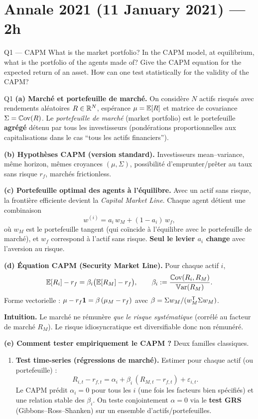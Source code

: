 \section{Annale 2021 (11 January 2021) --- 2h}

\begin{questionbox}{Q1 --- CAPM}
What is the market portfolio? In the CAPM model, at equilibrium, what is the portfolio of the agents made of? Give the CAPM equation for the expected return of an asset. How can one test statistically for the validity of the CAPM?
\end{questionbox}

\begin{solutionbox}{Q1}
\textbf{(a) Marché et portefeuille de marché.} On considère $N$ actifs risqués avec rendements aléatoires $R\in\mathbb{R}^N$, espérance $\mu=\mathbb{E}[R]$ et matrice de covariance $\Sigma=\mathbb{C}\mathrm{ov}(R)$. Le \emph{portefeuille de marché} (market portfolio) est le portefeuille \textbf{agrégé} détenu par tous les investisseurs (pondérations proportionnelles aux capitalisations dans le cas ``tous les actifs financiers'').

\medskip
\textbf{(b) Hypothèses CAPM (version standard).} Investisseurs mean--variance, même horizon, mêmes croyances $(\mu,\Sigma)$, possibilité d'emprunter/prêter au taux sans risque $r_f$, marchés frictionless.

\medskip
\textbf{(c) Portefeuille optimal des agents à l'équilibre.} Avec un actif sans risque, la frontière efficiente devient la \emph{Capital Market Line}. Chaque agent détient une combinaison
\[
w^{(i)} = a_i\, w_M + (1-a_i)\, w_f,
\]
où $w_M$ est le portefeuille tangent (qui coïncide à l'équilibre avec le portefeuille de marché), et $w_f$ correspond à l'actif sans risque. \textbf{Seul le levier $a_i$ change} avec l'aversion au risque.

\medskip
\textbf{(d) Équation CAPM (Security Market Line).} Pour chaque actif $i$,
\[
\mathbb{E}[R_i] - r_f = \beta_i\big(\mathbb{E}[R_M]-r_f\big),
\qquad
\beta_i := \frac{\mathbb{C}\mathrm{ov}(R_i,R_M)}{\mathbb{V}\mathrm{ar}(R_M)}.
\]
Forme vectorielle : $\mu - r_f\mathbf{1} = \beta\,(\mu_M-r_f)$ avec $\beta=\Sigma w_M / (w_M^{\mathsf{T}} \Sigma w_M)$.

\medskip
\textbf{Intuition.} Le marché ne rémunère \emph{que le risque systématique} (corrélé au facteur de marché $R_M$). Le risque idiosyncratique est diversifiable donc non rémunéré.

\medskip
\textbf{(e) Comment tester empiriquement le CAPM ?} Deux familles classiques.
\begin{enumerate}[leftmargin=*,label=\arabic*)]
  \item \textbf{Test time-series (régressions de marché).} Estimer pour chaque actif (ou portefeuille) :
  \[
  R_{i,t}-r_{f,t} = \alpha_i + \beta_i\,(R_{M,t}-r_{f,t}) + \varepsilon_{i,t}.
  \]
  Le CAPM prédit \textbf{$\alpha_i=0$} pour tous les $i$ (une fois les facteurs bien spécifiés) et une relation stable des $\beta_i$.
  On teste conjointement $\alpha=0$ via le \textbf{test GRS} (Gibbons--Ross--Shanken) sur un ensemble d'actifs/portefeuilles.


\end{enumerate}
\end{solutionbox}
